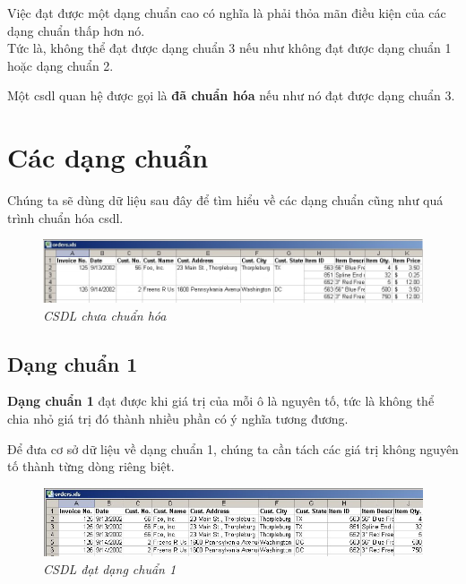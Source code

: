 \documentclass[11pt]{beamer}
\begin{document}
\begin{frame}
  Việc đạt được một dạng chuẩn cao có nghĩa là phải thỏa mãn điều kiện của các dạng chuẩn thấp hơn nó.\\
  Tức là, không thể đạt được dạng chuẩn 3 nếu như không đạt được dạng chuẩn 1 hoặc dạng chuẩn 2.
\end{frame}

\begin{frame}
  Một csdl quan hệ được gọi là \textbf{đã chuẩn hóa} nếu như nó đạt được dạng chuẩn 3.
\end{frame}

\section{Các dạng chuẩn}
\begin{frame}
  Chúng ta sẽ dùng dữ liệu sau đây để tìm hiểu về các dạng chuẩn cũng như quá trình chuẩn hóa csdl.
  \begin{figure}
    \includegraphics[width=\textwidth]{COS212/un.png}
    \caption{\textit{CSDL chưa chuẩn hóa}}
  \end{figure}
\end{frame}

\subsection{Dạng chuẩn 1}
\begin{frame}
  \textbf{Dạng chuẩn 1} đạt được khi giá trị của mỗi ô là nguyên tố, tức là
  không thể chia nhỏ giá trị đó thành nhiều phần có ý nghĩa tương đương.
\end{frame}

\begin{frame}
  Để đưa cơ sở dữ liệu về dạng chuẩn 1, chúng ta cần tách các giá trị không nguyên tố 
  thành từng dòng riêng biệt.
  \begin{figure}
    \includegraphics[width=\textwidth]{COS212/1nf.png}
    \caption{\textit{CSDL đạt dạng chuẩn 1}}
  \end{figure}
\end{frame}
\end{document}
